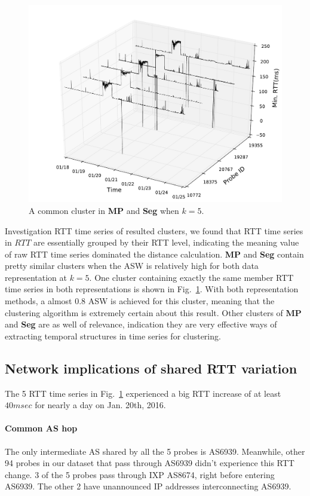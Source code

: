 \begin{figure}[!htb]
\centering
\includegraphics[width=.9\textwidth]{gfx/chap3/rtt3d_mp_cls2.pdf}
\caption{A common cluster in \textbf{MP} and \textbf{Seg} when $k=5$.}
\label{fig:rtt3d_mp_cls2}
\end{figure}

Investigation RTT time series of resulted clusters, we found that RTT time series in $RTT$ are essentially grouped by their RTT level, indicating the meaning value of raw RTT time series dominated the distance calculation. \textbf{MP} and \textbf{Seg} contain pretty similar clusters when the \ac{ASW} is relatively high for both data representation at $k=5$. One cluster containing exactly the same member RTT time series in both representations is shown in Fig.~\ref{fig:rtt3d_mp_cls2}. With both representation methods, a almost 0.8 \ac{ASW} is achieved for this cluster, meaning that the clustering algorithm is extremely certain about this result. Other clusters of \textbf{MP} and \textbf{Seg} are as well of relevance, indication they are very effective ways of extracting temporal structures in time series for clustering.

\subsection{Network implications of shared RTT variation}

The 5 RTT time series in Fig.~\ref{fig:rtt3d_mp_cls2} experienced a big RTT increase of at least $40msec$ for nearly a day on Jan. 20th, 2016.

\paragraph*{Common AS hop} The only intermediate AS shared by all the 5 probes is AS6939.
Meanwhile, other 94 probes in our dataset that pass through AS6939 didn't experience this RTT change.
3 of the 5 probes pass through IXP AS8674, right before entering AS6939.
The other 2 have unannounced IP addresses interconnecting AS6939.

